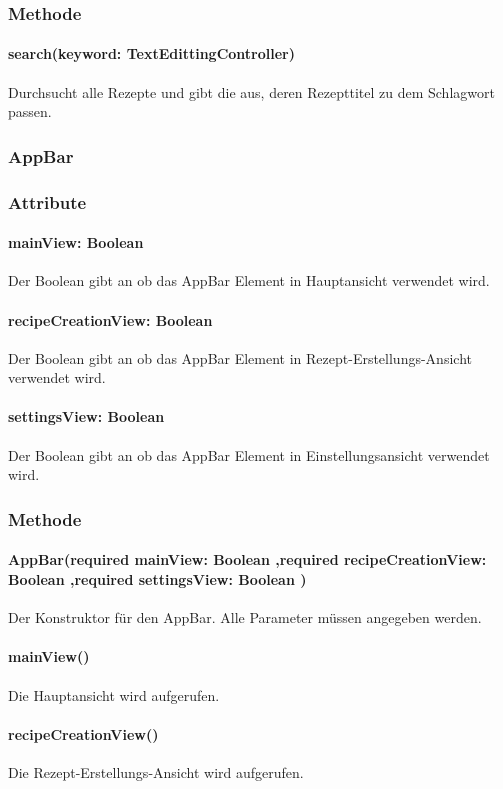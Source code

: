 \documentclass{entwurfsheft}
\begin{document}
\subsubsection*{Methode}
\paragraph*{ search(keyword: TextEdittingController)} Durchsucht alle Rezepte und gibt die aus, deren Rezepttitel zu dem Schlagwort passen.


\subsubsection{AppBar} \label{sec:AppBar}
\subsubsection*{Attribute}
\paragraph*{mainView: Boolean} Der Boolean gibt an ob das AppBar Element in Hauptansicht verwendet wird.
\paragraph*{recipeCreationView: Boolean} Der Boolean gibt an ob das AppBar Element in Rezept-Erstellungs-Ansicht verwendet wird.
\paragraph*{settingsView: Boolean} Der Boolean gibt an ob das AppBar Element in Einstellungsansicht verwendet wird.

\subsubsection*{Methode}
\paragraph*{AppBar(required mainView: Boolean ,required recipeCreationView: Boolean ,required settingsView: Boolean )} Der Konstruktor für den AppBar. Alle Parameter müssen angegeben werden.
\paragraph*{mainView()} Die Hauptansicht wird aufgerufen.
\paragraph*{recipeCreationView()} Die Rezept-Erstellungs-Ansicht wird aufgerufen.
\end{document}
